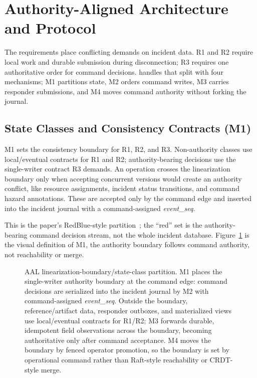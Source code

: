 \section{Authority-Aligned Architecture and Protocol}
\label{sec:architecture}

The requirements place conflicting demands on incident data. R1 and R2 require
local work and durable submission during disconnection; R3 requires one
authoritative order for command decisions. \systemname{} handles that split with
four mechanisms; M1 partitions state, M2 orders command writes, M3 carries
responder submissions, and M4 moves command authority without forking the journal.

\subsection{State Classes and Consistency Contracts (M1)}
\label{sec:state-taxonomy}

M1 sets the consistency boundary for R1, R2, and R3. Non-authority classes use
local/eventual contracts for R1 and R2; authority-bearing decisions use the
single-writer contract R3 demands. An operation crosses the linearization
boundary only when accepting concurrent versions would create an authority
conflict, like resource assignments, incident status transitions, and command hazard
annotations. These are accepted only by the command edge and inserted into the
incident journal with a command-assigned \textit{event\_seq}. 

This is the paper's
RedBlue-style partition~\cite{li2012redblue}; the ``red'' set is the
authority-bearing command decision stream, not the whole incident database.
Figure~\ref{fig:linearization-boundary} is the visual definition of M1, the
authority boundary follows command authority, not reachability or merge.

\begin{figure}[t]
\centering
\resizebox{0.9\columnwidth}{!}{}
\caption{AAL linearization-boundary/state-class partition. M1 places the
single-writer authority boundary at the command edge: command decisions are
serialized into the incident journal by M2 with command-assigned
\textit{event\_seq}. Outside the boundary, reference/artifact data, responder
outboxes, and materialized views use local/eventual contracts for R1/R2; M3
forwards durable, idempotent field observations across the boundary, becoming
authoritative only after command acceptance. M4 moves the boundary by fenced
operator promotion, so the boundary is set by operational command rather than
Raft-style reachability or CRDT-style merge.}
\label{fig:linearization-boundary}
\end{figure}

